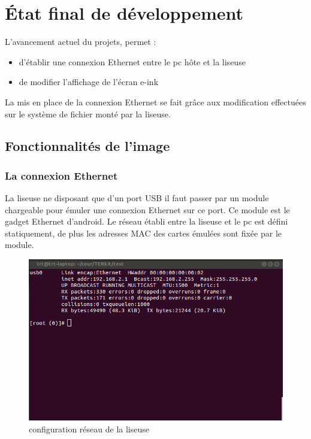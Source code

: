 \chapter{État final de développement}

L'avancement actuel du projets, permet : 
\begin{itemize}
	\item  d'établir une connexion Ethernet entre le pc hôte et la liseuse
	\item de modifier l'affichage de l'écran e-ink
\end{itemize}

La mis en place de la connexion Ethernet se fait grâce aux modification effectuées sur le système de fichier monté par la liseuse.

\section{Fonctionnalités de l'image} %

\subsection{La connexion Ethernet}
La liseuse ne disposant que d'un port USB il faut passer par un module chargeable pour émuler une connexion Ethernet sur ce port.
Ce module est le gadget Ethernet d'android.
Le réseau établi entre la liseuse et le pc est défini statiquement, de plus les adresses MAC des cartes émulées sont fixée par le module.

\begin{figure}[]
	\begin{center}
	\includegraphics[scale=0.5]{capt_prs_ifconfig.png}	
	\end{center}
	\caption{configuration réseau de la liseuse}
\end{figure}


